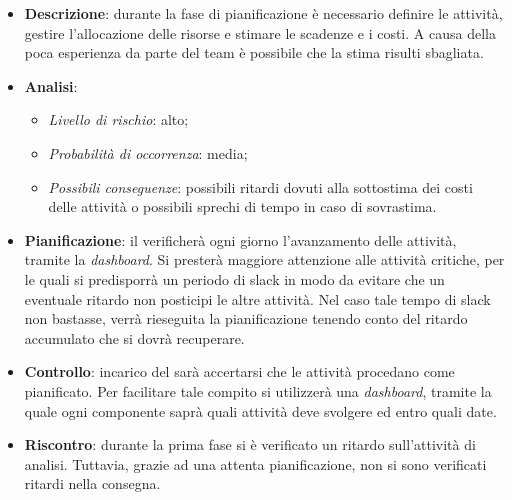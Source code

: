 			\begin{itemize}
				\item \textbf{Descrizione}: durante la fase di pianificazione è necessario definire le attività, gestire l'allocazione delle risorse e stimare le scadenze e i costi. A causa della poca esperienza da parte del team è possibile che la stima risulti sbagliata.
				\item \textbf{Analisi}:
				\begin{itemize}
					\item \textit{Livello di rischio}: alto;
					\item \textit{Probabilità di occorrenza}: media;
					\item \textit{Possibili conseguenze}: possibili ritardi dovuti alla sottostima dei costi delle attività o possibili sprechi di tempo in caso di sovrastima. 
				\end{itemize}
				\item \textbf{Pianificazione}: il  verificherà ogni giorno l'avanzamento delle attività, tramite la \textit{dashboard}. Si presterà maggiore attenzione alle attività critiche, per le quali si predisporrà un periodo di slack in modo da evitare che un eventuale ritardo non posticipi le altre attività. Nel caso tale tempo di slack non bastasse, verrà rieseguita la pianificazione tenendo conto del ritardo accumulato che si dovrà recuperare.
				\item \textbf{Controllo}: incarico del  sarà accertarsi che le attività procedano come pianificato. Per facilitare tale compito si utilizzerà una \textit{dashboard}, tramite la quale ogni componente saprà quali attività deve svolgere ed entro quali date.
				\item \textbf{Riscontro}: durante la prima fase si è verificato un ritardo sull'attività di analisi. Tuttavia, grazie ad una attenta pianificazione, non si sono verificati ritardi nella consegna. 
			\end{itemize}
